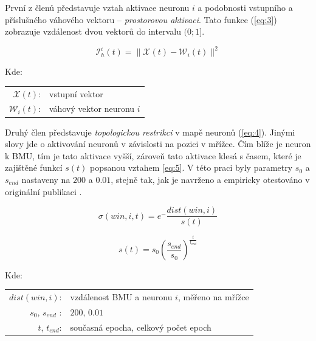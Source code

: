 \documentclass[thesis=M,czech]{FITthesis}[2012/06/26]
\begin{document}
První z členů představuje vztah aktivace neuronu $i$  a podobnosti vstupního a příslušného váhového vektoru -- \textit{prostorovou aktivaci}. Tato funkce (\ref{eq:3}) zobrazuje vzdálenost dvou vektorů do intervalu $(0;1]$.


\vspace{\baselineskip}
\noindent
\begin{minipage}[c]{\textwidth }
\begin{equation} \label{eq:3}
    \mathcal{I}_h^i(t) = \|\mathcal{X}(t)-\mathcal{W}_i(t)\|^2   
\end{equation}

Kde:\\
\hspace*{3em}
\begin{tabular}{rl}
    $\mathcal{X}(t)$:& vstupní vektor \\
    $\mathcal{W}_i(t)$:& váhový vektor neuronu $i$ \\
\end{tabular}
\end{minipage} 
\vspace{\baselineskip}
\noindent

 

Druhý člen představuje \textit{topologickou restrikci} v mapě neuronů (\ref{eq:4}). Jinými slovy jde o aktivování neuronů v závislosti na pozici v mřížce. Čím blíže je neuron k BMU, tím je tato aktivace vyšší, zároveň tato aktivace klesá s časem, které je zajištěné funkcí $s(t)$ popsanou vztahem \ref{eq:5}.  
V této praci byly parametry $s_0$ a $s_{end}$ nastaveny na $200$ a $0.01$, stejně tak, jak je navrženo a empiricky otestováno v originální publikaci \cite{hartono14}.


\vspace{\baselineskip}
\noindent
\begin{minipage}[c]{\textwidth }

\begin{equation} \label{eq:4}
    \sigma(win, i, t)=e^-\frac{dist(win, i)}{s(t)}  
\end{equation}

\begin{equation} \label{eq:5}
    {s(t)=s_0(\frac{s_{end}}{s_0})^\frac{t}{t_{end}}}  
\end{equation}

Kde:\\
\hspace*{3em}
\begin{tabular}{rl}
    $dist(win, i)$:& vzdálenost BMU a neuronu $i$, měřeno na mřížce \\
    $s_0$, $s_{end}$ :& $200$, $0.01$ \\
     $t$, $t_{end}$:& současná epocha, celkový počet epoch \\
\end{tabular}
\end{minipage} 
\vspace{\baselineskip}
\noindent
\end{document}
